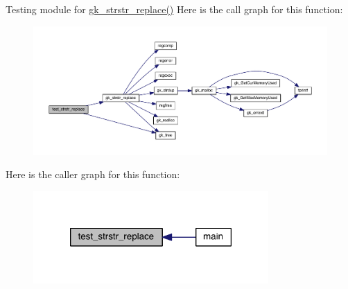 Testing module for \hyperlink{a00077_a46e5cf8f76a1ece74adf1b8b9dfcb275}{gk\+\_\+strstr\+\_\+replace()} Here is the call graph for this function\+:\nopagebreak
\begin{figure}[H]
\begin{center}
\leavevmode
\includegraphics[width=350pt]{a00155_a3666be16b4df33d86374ee780353af54_cgraph}
\end{center}
\end{figure}
Here is the caller graph for this function\+:\nopagebreak
\begin{figure}[H]
\begin{center}
\leavevmode
\includegraphics[width=254pt]{a00155_a3666be16b4df33d86374ee780353af54_icgraph}
\end{center}
\end{figure}
